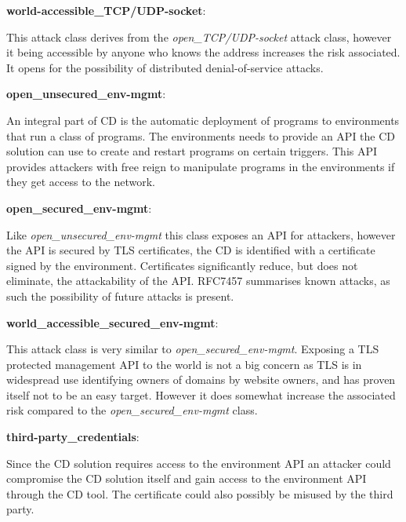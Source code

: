 
\pagebreak[2]
\textbf{world-accessible\_TCP/UDP-socket}: \begin{displayquote}
This attack class derives from the \textit{open\_TCP/UDP-socket} attack class, however it being accessible by anyone who knows the address increases the risk associated. It opens for the possibility of distributed denial-of-service attacks\cite{ddos}.
\end{displayquote}

\pagebreak[2]
\textbf{open\_unsecured\_env-mgmt}: \begin{displayquote}
An integral part of \acrshort{CD} is the automatic deployment of programs to environments that run a class of programs. The environments needs to provide an \acrshort{API} the \acrshort{CD} solution can use to create and restart programs on certain triggers. This \acrshort{API} provides attackers with free reign to manipulate programs in the environments if they get access to the network. 
\end{displayquote}

\pagebreak[2]
\textbf{open\_secured\_env-mgmt}: \begin{displayquote}
Like \textit{open\_unsecured\_env-mgmt} this class exposes an \acrshort{API} for attackers, however the \acrshort{API} is secured by TLS certificates, the \acrshort{CD} is identified with a certificate signed by the environment. Certificates significantly reduce, but does not eliminate, the attackability of the \acrshort{API}. RFC7457\cite{rfc7457} summarises known attacks, as such the possibility of future attacks is present.
\end{displayquote}

\pagebreak[2]
\textbf{world\_accessible\_secured\_env-mgmt}: \begin{displayquote}
This attack class is very similar to \textit{open\_secured\_env-mgmt}. Exposing a TLS protected management \acrshort{API} to the world is not a big concern as TLS is in widespread use identifying owners of domains by website owners\cite{sslpulse}, and has proven itself not to be an easy target. However it does somewhat increase the associated risk compared to the \textit{open\_secured\_env-mgmt} class.
\end{displayquote}

\pagebreak[2]
\textbf{third-party\_credentials}: \begin{displayquote}
Since the \acrshort{CD} solution requires access to the environment \acrshort{API} an attacker could compromise the \acrshort{CD} solution itself and gain access to the environment \acrshort{API} through the \acrshort{CD} tool. The certificate could also possibly be misused by the third party.
\end{displayquote}


